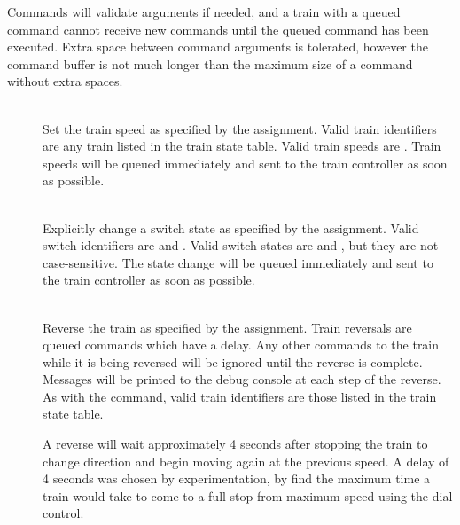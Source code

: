\documentclass[pdftex,10pt,a4paper]{article}
\begin{document}
Commands will validate arguments if needed, and a train with a queued
command cannot receive new commands until the queued command has been
executed. Extra space between command arguments is tolerated, however
the command buffer is not much longer than the maximum size of a
command without extra spaces.

\vspace{10mm}

\begin{description}

\item[] \hfill \\

Set the train speed as specified by the assignment. Valid train
identifiers are any train listed in the train state table. Valid train
speeds are . Train speeds will be queued immediately and
sent to the train controller as soon as possible.

\item[] \hfill \\

Explicitly change a switch state as specified by the assignment. Valid
switch identifiers are  and . Valid switch states
are  and , but they are not case-sensitive. The state
change will be queued immediately and sent to the train controller as
soon as possible.

\item[] \hfill \\

Reverse the train as specified by the assignment. Train reversals are
queued commands which have a delay. Any other commands to the train
while it is being reversed will be ignored until the reverse is
complete. Messages will be printed to the debug console at each step
of the reverse. As with the  command, valid train identifiers
are those listed in the train state table.

A reverse will wait approximately 4 seconds after
stopping the train to change direction and begin moving again at the
previous speed. A delay of 4 seconds was chosen by experimentation,
by find the maximum time a train would take to come to a full stop
from maximum speed using the dial control.

\vspace{10mm}

\item[] \hfill \\


\end{description}
\end{document}
